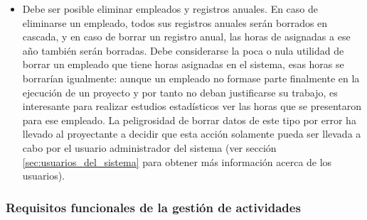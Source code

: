 \begin{itemize}
\item Debe ser posible eliminar empleados y registros anuales. En caso de
eliminarse un empleado, todos sus registros anuales serán borrados en
cascada, y en caso de borrar un registro anual, las horas de asignadas a ese
año también serán borradas. Debe considerarse la poca o nula utilidad de borrar
un empleado que tiene horas asignadas en el sistema, esas horas se borrarían
igualmente: aunque un empleado no formase parte finalmente en la ejecución de un
proyecto y por tanto no deban justificarse su trabajo, es interesante para
realizar estudios estadísticos ver las horas que se presentaron para ese
empleado. La peligrosidad de borrar datos de este tipo por error ha llevado al
proyectante a decidir que esta acción solamente pueda ser llevada a cabo por el
usuario administrador del sistema (ver sección \ref{sec:usuarios_del_sistema}
para obtener más información acerca de los usuarios).
\end{itemize}

\subsubsection{Requisitos funcionales de la gestión de actividades}
\label{sec:gestion_actividades}

